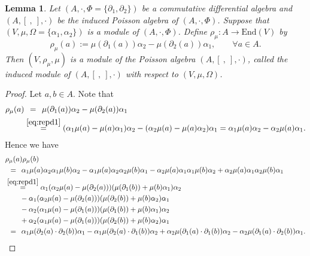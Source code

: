 \documentclass[10pt,a4paper]{amsart}
\numberwithin{equation}{section}
\newtheorem{Lemma}[Theorem]{Lemma}
\newcommand{\End}{\mathrm{End}}
\begin{document}
\begin{Lemma}\label{lem:rep_poisson}
 Let $(A, \cdot, \Phi = \{\partial_1, \partial_2\})$ be a commutative differential algebra and $(A, [\ ,\ ], \cdot)$ be the induced Poisson algebra of $(A, \cdot, \Phi)$.
 Suppose that $(V, \mu, \Omega = \{\alpha_1, \alpha_2\})$ is a module of $(A, \cdot, \Phi)$.
 Define $\rho_\mu\colon A \to \End (V)$ by
 \begin{equation}
 \rho_\mu(a) := \mu(\partial_1(a)) \alpha_2 - \mu(\partial_2(a))\alpha_1, \qquad
 \forall a \in A. \label{eq:def_rep_lie}
 \end{equation}
 Then $(V, \rho_\mu, \mu)$ is a module of the Poisson algebra $(A, [\ ,\ ], \cdot)$,
 called the \textit{induced module of $(A, [\ ,\ ], \cdot)$ with respect to $(V, \mu, \Omega)$}.
\end{Lemma}
\begin{proof}
 Let $a, b \in A$.
 Note that
 \begin{align*}
 	\rho_\mu(a) &\overset{\hphantom{(2.3)}}{=} \mu(\partial_1(a))\alpha_2 - \mu(\partial_2(a))\alpha_1 \\
 	&\overset{\eqref{eq:repd1}}{=} (\alpha_1 \mu(a) - \mu(a) \alpha_1)\alpha_2 - (\alpha_2 \mu(a) - \mu(a) \alpha_2)\alpha_1 = \alpha_1 \mu(a) \alpha_2 - \alpha_2 \mu(a) \alpha_1.
 \end{align*}
 Hence we have
 \begin{equation*}
 \begin{aligned}
 &\rho_\mu(a)\rho_\mu(b) \\
 &\overset{\hphantom{(2.3)}}{=} \alpha_1 \mu(a)\alpha_2 \alpha_1 \mu(b) \alpha_2 - \alpha_1 \mu(a)\alpha_2 \alpha_2 \mu(b) \alpha_1 - \alpha_2 \mu(a)\alpha_1 \alpha_1 \mu(b) \alpha_2 + \alpha_2 \mu(a)\alpha_1 \alpha_2 \mu(b) \alpha_1 \\
 &\overset{\eqref{eq:repd1}}{=} \alpha_1(\alpha_2 \mu(a) - \mu(\partial_2(a)))(\mu(\partial_1(b)) + \mu(b)\alpha_1) \alpha_2 \\
 &\qquad {}- \alpha_1(\alpha_2\mu(a)- \mu(\partial_2(a)))(\mu(\partial_2(b)) + \mu(b)\alpha_2)\alpha_1 \\
 & \qquad {}-\alpha_2(\alpha_1 \mu(a) - \mu(\partial_1(a)))(\mu(\partial_1(b)) + \mu(b)\alpha_1) \alpha_2 \\
 &\qquad {}+ \alpha_2(\alpha_1 \mu(a) - \mu(\partial_1(a)))(\mu(\partial_2(b)) + \mu(b)\alpha_2)\alpha_1 \\
 &\overset{\hphantom{(2.3)}}{=} \alpha_1 \mu(\partial_2(a) \cdot \partial_2(b)) \alpha_1 - \alpha_1 \mu(\partial_2(a) \cdot \partial_1(b)) \alpha_2 + \alpha_2 \mu(\partial_1(a) \cdot \partial_1(b)) \alpha_2 - \alpha_2 \mu(\partial_1(a) \cdot \partial_2(b)) \alpha_1.

\end{aligned}
\end{equation*}
\end{proof}
\end{document}

